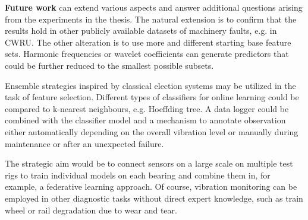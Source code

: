 \textbf{Future work} can extend various aspects and answer additional questions arising from the experiments in the thesis. The natural extension is to confirm that the results hold in other publicly available datasets of machinery faults, e.g. in CWRU. The other alteration is to use more and different starting base feature sets. Harmonic frequencies or wavelet coefficients can generate predictors that could be further reduced to the smallest possible subsets. 

Ensemble strategies inspired by classical election systems may be utilized in the task of feature selection. Different types of classifiers for online learning could be compared to k-nearest neighbours, e.g. Hoeffding tree. A data logger could be combined with the classifier model and a mechanism to annotate observation either automatically depending on the overall vibration level or manually during maintenance or after an unexpected failure.

The strategic aim would be to connect sensors on a large scale on multiple test rigs to train individual models on each bearing and combine them in, for example, a federative learning approach. Of course, vibration monitoring can be employed in other diagnostic tasks without direct expert knowledge, such as train wheel or rail degradation due to wear and tear.